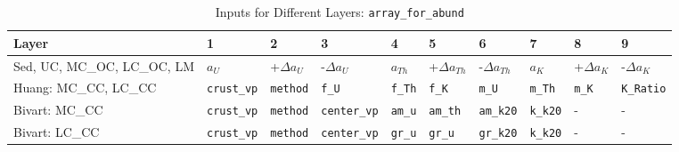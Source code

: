 				\begin{table}[H]
					\centering
					\caption{Inputs for Different Layers: \texttt{array\_for\_abund}}
					\begin{tabular}{p{3.5cm}| p{1.5cm} p{1cm} p{1.5cm} p{1cm} p{1cm} p{1.2cm} p{1cm} p{1cm} p{1cm}}
						\hline
						\hline
						Layer & 1 & 2 & 3 & 4 & 5 & 6 & 7 & 8 & 9\\
						\hline
						Sed, UC, MC\_OC, LC\_OC, LM & $a_U$ & +$\Delta a_U$ & -$\Delta a_U$ & $a_{Th}$ & +$\Delta a_{Th} $ & -$\Delta a_{Th}$ & $a_K$ & +$\Delta a_K$ & -$\Delta a_K$\\
						\hline
						Huang: MC\_CC, LC\_CC & \texttt{crust\_vp} & \texttt{method} & \texttt{f\_U} & \texttt{f\_Th} & \texttt{f\_K} & \texttt{m\_U} & \texttt{m\_Th} & \texttt{m\_K} & \texttt{K\_Ratio}\\
						\hline
						Bivart: MC\_CC & \texttt{crust\_vp} & \texttt{method} & \texttt{center\_vp} & \texttt{am\_u} & \texttt{am\_th} & \texttt{am\_k20} & \texttt{k\_k20} & - & -\\
						Bivart: LC\_CC & \texttt{crust\_vp} & \texttt{method} & \texttt{center\_vp} & \texttt{gr\_u} & \texttt{gr\_u} & \texttt{gr\_k20} & \texttt{k\_k20} & - & -\\
						\hline
						\hline
					\end{tabular}
				\end{table}
